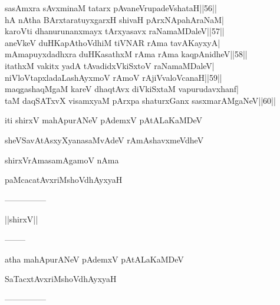 \documentclass{article}
\begin{document}
sasAmxra sAvxminaM tatarx pAvaneVrupadeVshataH||56||\\
hA nAtha BArxtaratuyxgarxH shivaH pArxNApahAraNaM|\\
karoVti dhanurunanxmayx tArxyasavx raNamaMDaleV||57||\\
aneVkeV duHKapAthoVdhiM tiVNAR rAma tavAKayxyA|\\
mAmapuyxdadhxra duHKasathxM rAma rAma kaqpAnidheV||58||\\
itathxM vakitx yadA tAvadidxVkiSxtoV raNamaMDaleV|\\
niVloVtapxladaLashAyxmoV rAmoV rAjiVvaloVcanaH||59||\\
maqgashaqMgaM kareV dhaqtAvx diVkiSxtaM vapurudavxhanf|\\
taM daqSATxvX visamxyaM pArxpa shaturxGanx sasxmarAMgaNeV||60||

\begin{center}
iti shirxV mahApurANeV pAdemxV pAtALaKaMDeV
\end{center}

\begin{center}
sheVSavAtAsxyXyanasaMvAdeV rAmAshavxmeVdheV
\end{center}

\begin{center}
shirxVrAmasamAgamoV nAma
\end{center}

\begin{center}
paMcacatAvxriMshoVdhAyxyaH
\end{center}

\begin{center}
---------------
\end{center}

\begin{center}
||shirxV||
\end{center}

\begin{center}
--------
\end{center}

\begin{center}
atha mahApurANeV pAdemxV pAtALaKaMDeV
\end{center}

\begin{center}
SaTacxtAvxriMshoVdhAyxyaH
\end{center}

\begin{center}
---------------
\end{center}
\end{document}
